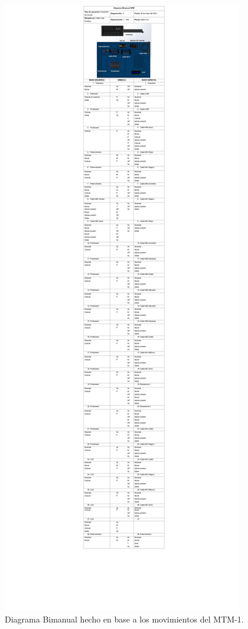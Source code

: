     \begin{figure}[H]
        \centering
        \includegraphics[trim = {1mm 200mm 1mm 1mm},clip,scale=0.08]{19/Img/diagrama_Bimanual_2.pdf}
        \newpage
        \caption{Diagrama Bimanual hecho en base a los movimientos del MTM-1.}
        \label{fig:diagrama_Bimanual_2}

        
    \end{figure}
